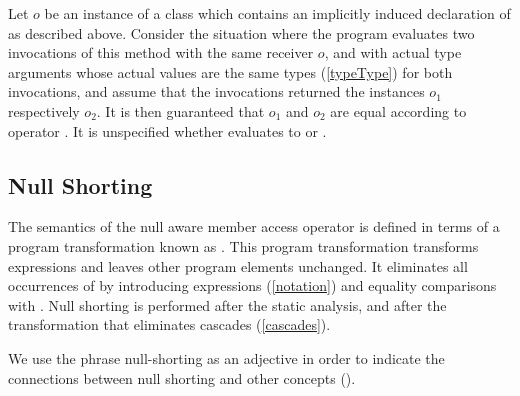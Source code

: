 \documentclass[makeidx]{article}
\begin{document}
{{\LMHash{}%
Let $o$ be an instance of a class which contains
an implicitly induced declaration of \gmiName{}
as described above.
%
Consider the situation where the program evaluates
two invocations of this method with the same receiver $o$,
and with actual type arguments whose actual values are
the same types (\ref{typeType})  for both invocations,
and assume that the invocations returned
the instances $o_1$ respectively $o_2$.
%
It is then guaranteed that $o_1$ and $o_2$ are equal
according to operator \lit{==}.
It is unspecified whether
evaluates to \TRUE{} or \FALSE.

} %



\subsection{Null Shorting}


\LMHash{}%
The semantics of the null aware member access operator 
is defined in terms of a program transformation known as
.
This program transformation transforms expressions
and leaves other program elements unchanged.
It eliminates all occurrences of  by introducing \LET{} expressions
(\ref{notation})
and equality comparisons with \NULL.
Null shorting is performed after the static analysis,
and after the transformation that eliminates cascades
(\ref{cascades}).

\LMHash{}%
We use the phrase null-shorting as an adjective in order to
indicate the connections between null shorting and other concepts
().

}
\end{document}
